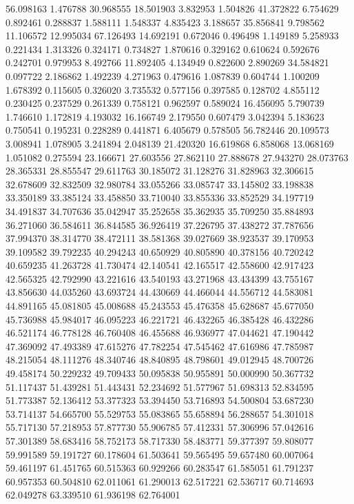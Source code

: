 56.098163
1.476788
30.968555
18.501903
3.832953
1.504826
41.372822
6.754629
0.892461
0.288837
1.588111
1.548337
4.835423
3.188657
35.856841
9.798562
11.106572
12.995034
67.126493
14.692191
0.672046
0.496498
1.149189
5.258933
0.221434
1.313326
0.324171
0.734827
1.870616
0.329162
0.610624
0.592676
0.242701
0.979953
8.492766
11.892405
4.134949
0.822600
2.890269
34.584821
0.097722
2.186862
1.492239
4.271963
0.479616
1.087839
0.604744
1.100209
1.678392
0.115605
0.326020
3.735532
0.577156
0.397585
0.128702
4.855112
0.230425
0.237529
0.261339
0.758121
0.962597
0.589024
16.456095
5.790739
1.746610
1.172819
4.193032
16.166749
2.179550
0.607479
3.042394
5.183623
0.750541
0.195231
0.228289
0.441871
6.405679
0.578505
56.782446
20.109573
3.008941
1.078905
3.241894
2.048139
21.420320
16.619868
6.858068
13.068169
1.051082
0.275594
23.166671
27.603556
27.862110
27.888678
27.943270
28.073763
28.365331
28.855547
29.611763
30.185072
31.128276
31.828963
32.306615
32.678609
32.832509
32.980784
33.055266
33.085747
33.145802
33.198838
33.350189
33.385124
33.458850
33.710040
33.855336
33.852529
34.197719
34.491837
34.707636
35.042947
35.252658
35.362935
35.709250
35.884893
36.271060
36.584611
36.844585
36.926419
37.226795
37.438272
37.787656
37.994370
38.314770
38.472111
38.581368
39.027669
38.923537
39.170953
39.109582
39.792235
40.294243
40.650929
40.805890
40.378156
40.720242
40.659235
41.263728
41.730474
42.140541
42.165517
42.558600
42.917423
42.565325
42.792990
43.221616
43.540193
43.271968
43.434399
43.755167
43.856630
44.035260
43.693724
44.430669
44.466044
44.556712
44.583081
44.891165
45.081805
45.008688
45.243553
45.476358
45.628687
45.677050
45.736988
45.984017
46.095223
46.221721
46.432265
46.385428
46.432286
46.521174
46.778128
46.760408
46.455688
46.936977
47.044621
47.190442
47.369092
47.493389
47.615276
47.782254
47.545462
47.616986
47.785987
48.215054
48.111276
48.340746
48.840895
48.798601
49.012945
48.700726
49.458174
50.229232
49.709433
50.095838
50.955891
50.000990
50.367732
51.117437
51.439281
51.443431
52.234692
51.577967
51.698313
52.834595
51.773387
52.136412
53.377323
53.394450
53.716893
54.500804
53.687230
53.714137
54.665700
55.529753
55.083865
55.658894
56.288657
54.301018
55.717130
57.218953
57.877730
55.906785
57.412331
57.306996
57.042616
57.301389
58.683416
58.752173
58.717330
58.483771
59.377397
59.808077
59.991589
59.191727
60.178604
61.503641
59.565495
59.657480
60.007064
59.461197
61.451765
60.515363
60.929266
60.283547
61.585051
61.791237
60.957353
60.504810
62.011061
61.290013
62.517221
62.536717
60.714693
62.049278
63.339510
61.936198
62.764001
